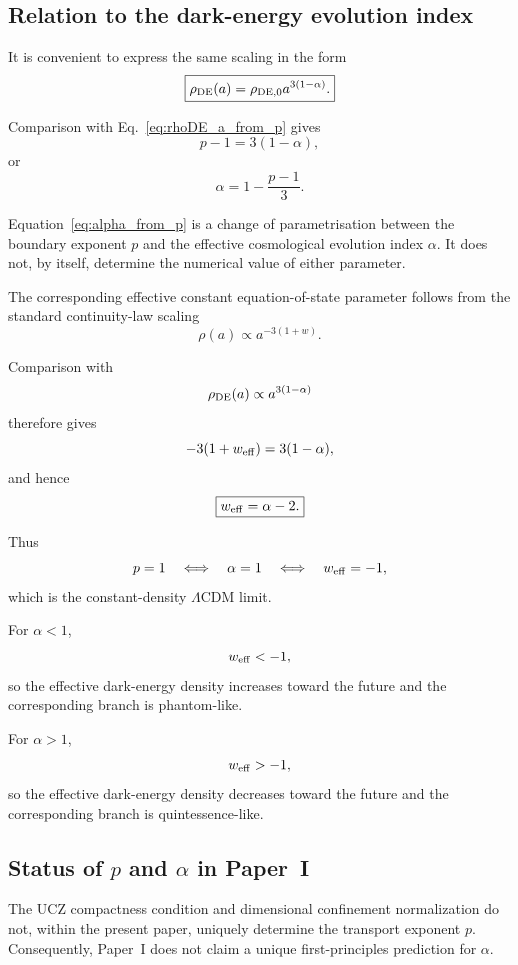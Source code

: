 \documentclass[12pt]{article}
\begin{document}
\subsection{Relation to the dark-energy evolution index}

It is convenient to express the same scaling in the form
\begin{equation}
\boxed{
\rho_{\rm DE}(a)
=
\rho_{{\rm DE},0}a^{3(1-\alpha)}.
}
\label{eq:rhoDE_a}
\end{equation}

Comparison with Eq.~\eqref{eq:rhoDE_a_from_p} gives
\begin{equation}
p-1
=
3(1-\alpha),
\end{equation}
or
\begin{equation}
\boxed{
\alpha
=
1-\frac{p-1}{3}.
}
\label{eq:alpha_from_p}
\end{equation}

Equation~\eqref{eq:alpha_from_p} is a change of parametrisation between
the boundary exponent $p$ and the effective cosmological evolution
index $\alpha$. It does not, by itself, determine the numerical value
of either parameter.

The corresponding effective constant equation-of-state parameter
follows from the standard continuity-law scaling
\[
\rho(a)
\propto
a^{-3(1+w)}.
\]

Comparison with
\[
\rho_{\rm DE}(a)
\propto
a^{3(1-\alpha)}
\]
therefore gives
\[
-3(1+w_{\rm eff})
=
3(1-\alpha),
\]
and hence
\begin{equation}
\boxed{
w_{\rm eff}
=
\alpha-2.
}
\label{eq:weff_alpha}
\end{equation}

Thus
\[
p=1
\quad\Longleftrightarrow\quad
\alpha=1
\quad\Longleftrightarrow\quad
w_{\rm eff}=-1,
\]
which is the constant-density $\Lambda$CDM limit.

For $\alpha<1$,
\[
w_{\rm eff}<-1,
\]
so the effective dark-energy density increases toward the future and
the corresponding branch is phantom-like.

For $\alpha>1$,
\[
w_{\rm eff}>-1,
\]
so the effective dark-energy density decreases toward the future and
the corresponding branch is quintessence-like.
\subsection{Status of $p$ and $\alpha$ in Paper~I}

The UCZ compactness condition and dimensional confinement
normalization do not, within the present paper, uniquely determine the
transport exponent $p$. Consequently, Paper~I does not claim a unique
first-principles prediction for $\alpha$.
\end{document}
